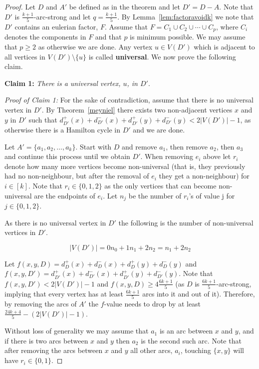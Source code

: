 \documentclass{article}
\newcommand{\2}{\vspace{2mm}}
\theoremstyle{plain}
\theoremstyle{definition}
\begin{document}
\begin{proof}
Let $D$ and $A'$ be defined as in the theorem and let $D'=D-A$. Note that $D'$ is 
$\frac{k+1}{5}$-arc-strong and let $q  = \frac{k+1}{5}$. By Lemma~\ref{lem:factoravoidk} we note that $D'$ contains an eulerian factor, $F$.
Assume that $F = C_1 \cup C_2 \cup \cdots \cup C_p$, where $C_i$ denotes the components in $F$ and that $p$ is minimum possible.
We may assume that $p \geq 2$ as otherwise we are done.
Any vertex $u \in V(D')$ which is adjacent to all vertices in $V(D')\setminus \{u\}$ is called {\bf universal}. 
We now prove the following claim.

\2

{\bf Claim 1:} {\em There is a universal vertex, $u$, in $D'$}.

\2


{\em Proof of Claim 1:} For the sake of contradiction, assume that there is no universal vertex in $D'$.
By Theorem~\ref{meyniel} there exists two non-adjacent vertices $x$ and $y$ in $D'$ such that
$d_{D'}^+(x)+d_{D'}^-(x)+d_{D'}^+(y)+d_{D'}^-(y) < 2|V(D')|-1$, as otherwise there is a Hamilton cycle in $D'$ and we are done.

Let $A' = \{a_1,a_2,\ldots,a_k\}$. Start with $D$ and remove $a_1$, then remove $a_2$, then $a_3$ and continue
this process until we obtain $D'$.  When removing $e_i$ above let $r_i$ denote how many more vertices become non-universal
(that is, they previously had no non-neighbour, but after the removal of $e_i$ they get a non-neighbour) for $i \in [k]$.
Note that $r_i \in \{0,1,2\}$ as the only vertices that can become non-universal are the endpoints of $e_i$.
Let $n_j$ be the number of $r_i$'s of value j for $j \in \{0,1,2\}$.

As there is no universal vertex in $D'$ the following is the number of non-universal vertices in $D'$.

\[
|V(D')| = 0 n_0 + 1 n_1 + 2 n_2 = n_1 + 2n_2  
\]

Let $f(x,y,D) = d_D^+(x)+d_D^-(x)+d_D^+(y)+d_D^-(y)$ and $f(x,y,D') = d_{D'}^+(x)+d_{D'}^-(x)+d_{D'}^+(y)+d_{D'}^-(y)$.
Note that $f(x,y,D') < 2|V(D')|-1$ and $f(x,y,D) \geq 4 \frac{6k+1}{5}$ (as $D$ is $\frac{6k+1}{5}$-arc-strong, implying
that every vertex has at least $\frac{6k+1}{5}$ arcs into it and out of it).
Therefore, by removing the arcs of $A'$ the $f$-value needs to drop by at least $\frac{24k+4}{5} - (2|V(D')|-1)$.

Without loss of generality we may assume that $a_1$ is an arc between $x$ and $y$, and if there is two arcs
between $x$ and $y$ then $a_2$ is the second such arc. Note that after removing the arcs 
between $x$ and $y$ all other arcs, $a_i$, touching $\{x,y\}$ will have $r_i \in \{0,1\}$.


\end{proof}
\end{document}

